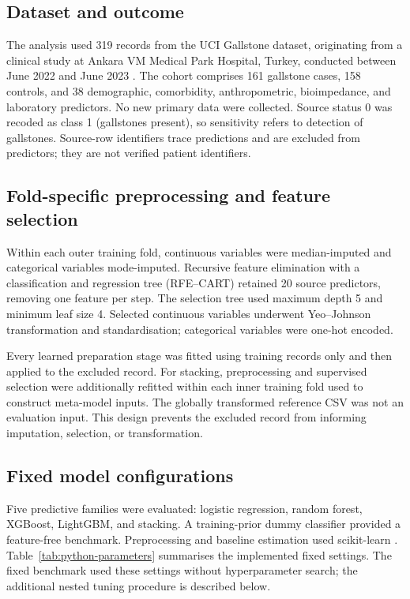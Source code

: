 \subsection{Dataset and outcome}
The analysis used 319 records from the UCI Gallstone dataset, originating from a clinical study at Ankara VM Medical Park Hospital, Turkey, conducted between June 2022 and June 2023 \parencite{esen2024early,uci2025gallstone}. The cohort comprises 161 gallstone cases, 158 controls, and 38 demographic, comorbidity, anthropometric, bioimpedance, and laboratory predictors. No new primary data were collected. Source status 0 was recoded as class 1 (gallstones present), so sensitivity refers to detection of gallstones. Source-row identifiers trace predictions and are excluded from predictors; they are not verified patient identifiers.

\subsection{Fold-specific preprocessing and feature selection}
Within each outer training fold, continuous variables were median-imputed and categorical variables mode-imputed. Recursive feature elimination with a classification and regression tree (RFE--CART) retained 20 source predictors, removing one feature per step. The selection tree used maximum depth 5 and minimum leaf size 4. Selected continuous variables underwent Yeo--Johnson transformation \parencite{yeo2000new} and standardisation; categorical variables were one-hot encoded.

Every learned preparation stage was fitted using training records only and then applied to the excluded record. For stacking, preprocessing and supervised selection were additionally refitted within each inner training fold used to construct meta-model inputs. The globally transformed reference CSV was not an evaluation input. This design prevents the excluded record from informing imputation, selection, or transformation.

\subsection{Fixed model configurations}
Five predictive families were evaluated: logistic regression, random forest, XGBoost, LightGBM, and stacking. A training-prior dummy classifier provided a feature-free benchmark. Preprocessing and baseline estimation used scikit-learn \parencite{pedregosa2011scikit}. Table~\ref{tab:python-parameters} summarises the implemented fixed settings. The fixed benchmark used these settings without hyperparameter search; the additional nested tuning procedure is described below.

